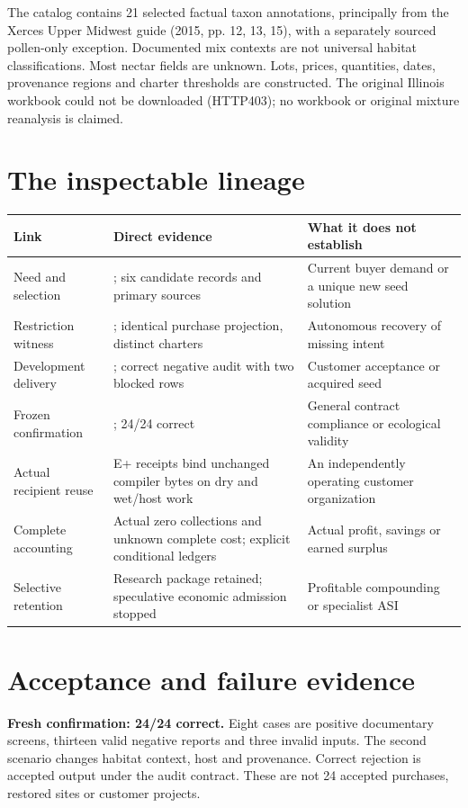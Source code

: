 \documentclass[10pt]{article}
\begin{document}
The catalog contains 21 selected factual taxon annotations, principally from the Xerces Upper Midwest guide (2015, pp. 12, 13, 15), with a separately sourced pollen-only exception. Documented mix contexts are not universal habitat classifications. Most nectar fields are unknown. Lots, prices, quantities, dates, provenance regions and charter thresholds are constructed. The original Illinois workbook could not be downloaded (HTTP403); no workbook or original mixture reanalysis is claimed.

\section{The inspectable lineage}
\begin{tabularx}{\textwidth}{@{}p{28mm}Y Y@{}}
\toprule
Link & Direct evidence & What it does not establish\\\midrule
Need and selection & ; six candidate records and primary sources & Current buyer demand or a unique new seed solution\\
Restriction witness & ; identical purchase projection, distinct charters & Autonomous recovery of missing intent\\
Development delivery & ; correct negative audit with two blocked rows & Customer acceptance or acquired seed\\
Frozen confirmation & ; 24/24 correct & General contract compliance or ecological validity\\
Actual recipient reuse & E+ receipts bind unchanged compiler bytes on dry and wet/host work & An independently operating customer organization\\
Complete accounting & Actual zero collections and unknown complete cost; explicit conditional ledgers & Actual profit, savings or earned surplus\\
Selective retention & Research package retained; speculative economic admission stopped & Profitable compounding or specialist ASI\\
\bottomrule
\end{tabularx}

\section{Acceptance and failure evidence}
\textbf{Fresh confirmation: 24/24 correct.} Eight cases are positive documentary screens, thirteen valid negative reports and three invalid inputs. The second scenario changes habitat context, host and provenance. Correct rejection is accepted output under the audit contract. These are not 24 accepted purchases, restored sites or customer projects.
\end{document}
